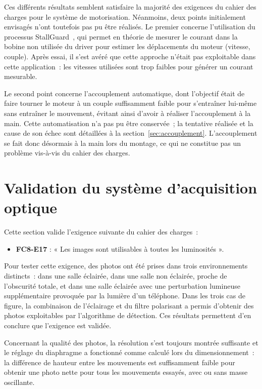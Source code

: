 Ces différents résultats semblent satisfaire la majorité des exigences du
cahier des charges pour le système de motorisation. 
Néanmoins, deux points initialement envisagés n'ont toutefois pas pu être réalisés. Le
premier concerne l'utilisation du processus StallGuard~\cite{Trinamic_StallGuard},
qui permet en théorie de mesurer le courant dans la bobine non utilisée du
driver pour estimer les déplacements du moteur (vitesse, couple). Après essai,
il s'est avéré que cette approche n'était pas exploitable dans cette
application~: les vitesses utilisées sont trop faibles pour générer un courant
mesurable.

Le second point concerne l'accouplement automatique, dont l'objectif était de
faire tourner le moteur à un couple suffisamment faible pour s'entraîner 
lui-même sans entraîner le mouvement, évitant ainsi d'avoir à réaliser
l'accouplement à la main. Cette automatisation n'a pas pu être conservée~;
la tentative réalisée et la cause de son échec sont détaillées à la
section~\ref{sec:accouplement}. L'accouplement se fait donc désormais à la
main lors du montage, ce qui ne constitue pas un problème vis-à-vis du
cahier des charges.


\section{Validation du système d'acquisition optique}
\label{sec:valid-optique}

Cette section valide l'exigence suivante du cahier des charges~:
\begin{itemize}
    \item \textbf{FC8-E17} : « Les images sont utilisables à toutes les
          luminosités ».
\end{itemize}

Pour tester cette exigence, des photos ont été prises dans trois environnements
distincts~: dans une salle éclairée, dans une salle non éclairée, proche de
l'obscurité totale, et dans une salle éclairée avec une perturbation
lumineuse supplémentaire provoquée par la lumière d'un téléphone. Dans les
trois cas de figure, la combinaison de l'éclairage et du filtre polarisant a
permis d'obtenir des photos exploitables par l'algorithme de détection. Ces
résultats permettent d'en conclure que l'exigence est validée.

Concernant la qualité des photos, la résolution s'est toujours montrée
suffisante et le réglage du diaphragme a fonctionné comme calculé lors du
dimensionnement~: la différence de hauteur entre les mouvements est
suffisamment faible pour obtenir une photo nette pour tous les mouvements
essayés, avec ou sans masse oscillante.

